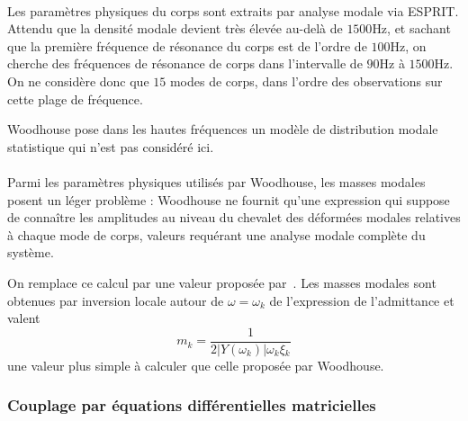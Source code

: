 \documentclass[a4paper,10pt]{article}
\begin{document}
  \paragraph{}
  Les paramètres physiques du corps sont extraits par analyse modale via ESPRIT.
Attendu que la densité modale devient très élevée au-delà de \( \si{1500\Hz} \),
et sachant que la première fréquence de résonance du corps est de l'ordre de
\( \si{100\Hz} \), on cherche des fréquences de résonance de corps dans
l'intervalle de \( \si{90\Hz} \) à \( \si{1500\Hz} \).
On ne considère donc que \( 15 \) modes de corps, dans l'ordre des observations
sur cette plage de fréquence.

Woodhouse pose dans les hautes fréquences un modèle de distribution modale
statistique qui n'est pas considéré ici.

    

\paragraph*{}

Parmi les paramètres physiques utilisés par Woodhouse, les masses modales
posent un léger problème : Woodhouse ne fournit qu'une expression qui suppose
de connaître les amplitudes au niveau du chevalet des déformées modales
relatives à chaque mode de corps, valeurs requérant une analyse modale
complète du système.
  
  On remplace ce calcul par une valeur proposée par~\textcite{pate14:phd}.
  Les masses modales sont obtenues par inversion locale autour de
\( \omega = \omega_k \) de l'expression de l'admittance et
valent \[ m_k = \frac{1}{2 |Y(\omega_k)| \omega{}_k \xi{}_k} \] une valeur plus
simple à calculer que celle proposée par Woodhouse.

\subsubsection{Couplage par équations différentielles matricielles}
\end{document}
